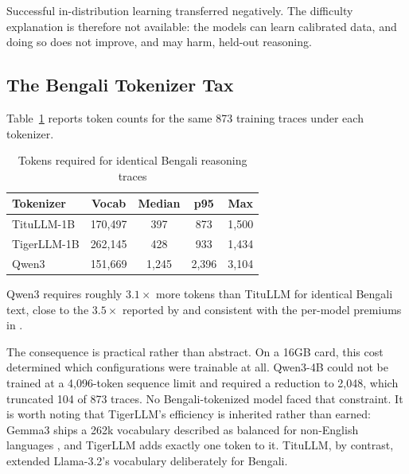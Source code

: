 
Successful in-distribution learning transferred negatively. The difficulty
explanation is therefore not available: the models can learn calibrated data,
and doing so does not improve, and may harm, held-out reasoning.

\subsection{The Bengali Tokenizer Tax}

Table~\ref{tab:tokenizer} reports token counts for the same 873 training traces
under each tokenizer.

\begin{table}[htbp]
\caption{Tokens required for identical Bengali reasoning traces}
\label{tab:tokenizer}
\centering
\begin{tabular}{|l|c|c|c|c|}
\hline
\textbf{Tokenizer} & \textbf{Vocab} & \textbf{Median} & \textbf{p95} & \textbf{Max} \\
\hline
TituLLM-1B  & 170,497 & 397   & 873   & 1,500 \\
TigerLLM-1B & 262,145 & 428   & 933   & 1,434 \\
Qwen3       & 151,669 & 1,245 & 2,396 & 3,104 \\
\hline
\end{tabular}
\end{table}

Qwen3 requires roughly $3.1\times$ more tokens than TituLLM for identical
Bengali text, close to the $3.5\times$ reported by
\textcite{yong2025crosslingual} and consistent with the per-model premiums in
\textcite{petrov2023language}. %

The consequence is practical rather than abstract. On a 16GB card, this cost
determined which configurations were trainable at all. Qwen3-4B could not be
trained at a 4,096-token sequence limit and required a reduction to 2,048, which
truncated 104 of 873 traces. No Bengali-tokenized model faced that constraint.
It is worth noting that TigerLLM's efficiency is inherited rather than earned:
Gemma3 ships a 262k vocabulary described as balanced for non-English languages
\parencite{gemma3}, %
and TigerLLM adds exactly one token to it. TituLLM, by contrast, extended
Llama-3.2's vocabulary deliberately for Bengali.


